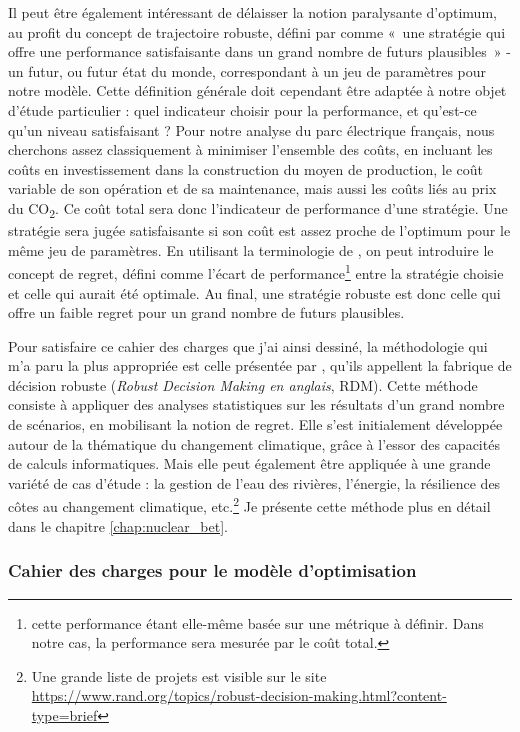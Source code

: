 Il peut être également intéressant de délaisser la notion paralysante d’optimum, au profit du concept de trajectoire robuste, défini par \citet{Lempert2006} comme «~une stratégie qui offre une performance satisfaisante dans un grand nombre de futurs plausibles~» - un futur, ou futur état du monde, correspondant à un jeu de paramètres pour notre modèle.
Cette définition générale doit cependant être adaptée à notre objet d’étude particulier : quel indicateur choisir pour la performance, et qu’est-ce qu’un niveau satisfaisant ?
Pour notre analyse du parc électrique français, nous cherchons assez classiquement à minimiser l'ensemble des coûts, en incluant les coûts en investissement dans la construction du moyen de production, le coût variable de son opération et de sa maintenance, mais aussi les coûts liés au prix du CO\textsubscript{2}. Ce coût total sera donc l’indicateur de performance d’une stratégie.
Une stratégie sera jugée satisfaisante si son coût est assez proche de l’optimum pour le même jeu de paramètres. En utilisant la terminologie de \citet{Savage1950}, on peut introduire le concept de regret, défini comme l’écart de performance\footnote{cette performance étant elle-même basée sur une métrique à définir. Dans notre cas, la performance sera mesurée par le coût total.} entre la stratégie choisie et celle qui aurait été optimale. Au final, une stratégie robuste est donc celle qui offre un faible regret pour un grand nombre de futurs plausibles.

Pour satisfaire ce cahier des charges que j’ai ainsi dessiné, la méthodologie qui m’a paru la plus appropriée est celle présentée par \citet{Lempert2006}, qu’ils appellent la fabrique de décision robuste (\textit{Robust Decision Making en anglais}, RDM). Cette méthode consiste à appliquer des analyses statistiques sur les résultats d’un grand nombre de scénarios, en mobilisant la notion de regret. Elle s’est initialement développée autour de la thématique du changement climatique, grâce à l’essor des capacités de calculs informatiques. Mais elle peut également être appliquée à une grande variété de cas d’étude : la gestion de l’eau des rivières, l’énergie, la résilience des côtes au changement climatique, etc.\footnote{Une grande liste de projets est visible sur le site \url{https://www.rand.org/topics/robust-decision-making.html?content-type=brief}} Je présente cette méthode plus en détail dans le chapitre \ref{chap:nuclear_bet}.
	
\subsubsection{Cahier des charges pour le modèle d’optimisation}

